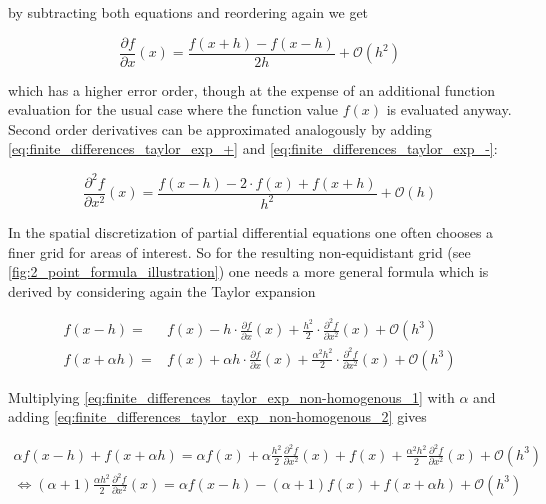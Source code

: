 \documentclass{scrartcl}[12pt, halfparskip]
\numberwithin{equation}{section}
\numberwithin{figure}{section}
\numberwithin{table}{section}
\begin{document}
by subtracting both equations and reordering again we get

\begin{equation}
\frac{\partial f}{\partial x}(x) = \frac{f(x+h) - f(x-h)}{2 h} + \mathcal{O}(h^2)
\end{equation}

which has a higher error order, though at the expense of an additional function evaluation for the usual case where the function value $f(x)$ is evaluated anyway. \\

Second order derivatives can be approximated analogously by adding \cref{eq:finite_differences_taylor_exp_+} and \cref{eq:finite_differences_taylor_exp_-}:

\begin{equation}
\frac{\partial^2 f}{\partial x^2}(x) = \frac{f(x-h) - 2 \cdot f(x) + f(x+h)}{h^2} + \mathcal{O}(h)
\label{eq:finite_difference_2nd_der}
\end{equation}

In the spatial discretization of partial differential equations one often chooses a finer grid for areas of interest. So for the resulting non-equidistant grid (see \cref{fig:2_point_formula_illustration}) one needs a more general formula which is derived by considering again the Taylor expansion

\begin{subequations}
	\label{eq:finite_differences_taylor_exp_non-homogenous}
	\begin{align}
	f(x-h) = & f(x) - h \cdot \frac{\partial f}{\partial x}(x) + \frac{h^2}{2} \cdot \frac{\partial^2 f}{\partial x^2}(x) + \mathcal{O}(h^3) \label{eq:finite_differences_taylor_exp_non-homogenous_1} \\
	f(x+\alpha h) = & f(x) + \alpha h \cdot \frac{\partial f}{\partial x}(x) + \frac{\alpha^2 h^2}{2} \cdot \frac{\partial^2 f}{\partial x^2}(x) + \mathcal{O}(h^3)  \label{eq:finite_differences_taylor_exp_non-homogenous_2}
	\end{align}
\end{subequations}



Multiplying \cref{eq:finite_differences_taylor_exp_non-homogenous_1} with $\alpha$ and adding \cref{eq:finite_differences_taylor_exp_non-homogenous_2} gives

\begin{align}
\alpha f(x-h) + f(x+\alpha h) = \alpha f(x) + \alpha \frac{h^2}{2} \frac{\partial^2 f}{\partial x^2}(x) + f(x) + \frac{\alpha^2 h^2}{2} \frac{\partial^2 f}{\partial x^2}(x) + \mathcal{O}(h^3)  \\
\Leftrightarrow (\alpha+1) \frac{\alpha h^2}{2} \frac{\partial^2 f}{\partial x^2}(x) = \alpha f(x-h) - (\alpha+1) f(x) + f(x+\alpha h) + \mathcal{O}(h^3) 
\end{align}
\end{document}
